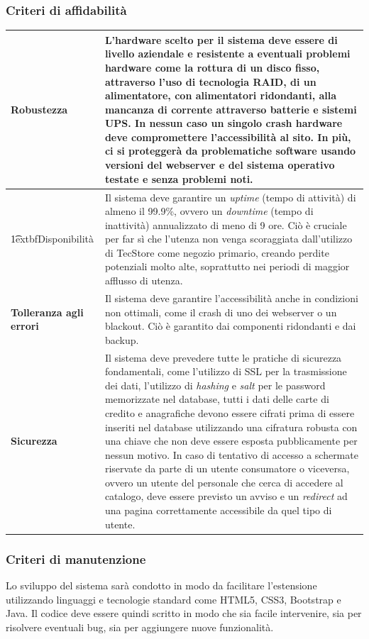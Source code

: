 \documentclass[12pt,a4paper]{article}
\begin{document}
\subsubsection{Criteri di affidabilità}
\begin{tabular}{|p{4cm}|p{12cm}|}
\hline
\textbf{Robustezza} & L'hardware scelto per il sistema deve essere di livello aziendale e resistente a eventuali problemi hardware come la rottura di un disco fisso, attraverso l'uso di tecnologia RAID, di un alimentatore, con alimentatori ridondanti, alla mancanza di corrente attraverso batterie e sistemi UPS. In nessun caso un singolo crash hardware deve compromettere l'accessibilità al sito.
In più, ci si proteggerà da problematiche software usando versioni del webserver e del sistema operativo testate e senza problemi noti. \\
\hline
\t1extbf{Disponibilità} & Il sistema deve garantire un \emph{uptime} (tempo di attività) di almeno il 99.9\%, ovvero un \textit{downtime} (tempo di inattività) annualizzato di meno di 9 ore. Ciò è cruciale per far sì che l'utenza non venga scoraggiata dall'utilizzo di TecStore come negozio primario, creando perdite potenziali molto alte, soprattutto nei periodi di maggior afflusso di utenza. \\
\hline
\textbf{Tolleranza agli errori} & Il sistema deve garantire l'accessibilità anche in condizioni non ottimali, come il crash di uno dei webserver o un blackout. Ciò è garantito dai componenti ridondanti e dai backup. \\
\hline
\textbf{Sicurezza} & Il sistema deve prevedere tutte le pratiche di sicurezza fondamentali, come l'utilizzo di SSL per la trasmissione dei dati, l'utilizzo di \textit{hashing} e \textit{salt} per le password memorizzate nel database, tutti i dati delle carte di credito e anagrafiche devono essere cifrati prima di essere inseriti nel database utilizzando una cifratura robusta con una chiave che non deve essere esposta pubblicamente per nessun motivo.
In caso di tentativo di accesso a schermate riservate da parte di un utente consumatore o viceversa, ovvero un utente del personale che cerca di accedere al catalogo, deve essere previsto un avviso e un \textit{redirect} ad una pagina correttamente accessibile da quel tipo di utente. \\
\hline
\end{tabular}

\subsubsection{Criteri di manutenzione}
Lo sviluppo del sistema sarà condotto in modo da facilitare l'estensione utilizzando linguaggi e tecnologie standard come HTML5, CSS3, Bootstrap e Java. Il codice deve essere quindi scritto in modo che sia facile intervenire, sia per risolvere eventuali bug, sia per aggiungere nuove funzionalità.
\end{document}

